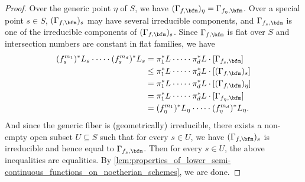 \begin{proof}
    Over the generic point $\eta$ of $S$, we have $(\Gamma_{f,\bfm})_\eta = \Gamma_{f_\eta,\bfm}$.
    Over a special point $s \in S$, $(\Gamma_{f,\bfm})_s$ may have several irreducible components, and $\Gamma_{f_s,\bfm}$ is one of the irreducible components of $(\Gamma_{f,\bfm})_s$.
    Since $\Gamma_{f,\bfm}$ is flat over $S$ and intersection numbers are constant in flat families, we have
    \begin{align*}
      (f_s^{m_1})^*L_s \cdot \cdots \cdot (f_s^{m_d})^*L_s & = \pi_1^*L \cdot \cdots \cdot \pi_d^*L \cdot [\Gamma_{f_s,\bfm}] \\
      & \leq \pi_1^*L \cdot \cdots \cdot \pi_d^*L \cdot [(\Gamma_{f,\bfm})_s] \\
      & = \pi_1^*L \cdot \cdots \cdot \pi_d^*L \cdot [(\Gamma_{f,\bfm})_\eta] \\
      & = \pi_1^*L \cdot \cdots \cdot \pi_d^*L \cdot [\Gamma_{f_\eta,\bfm}] \\
      & = (f_\eta^{m_1})^*L_\eta \cdot \cdots \cdot (f_\eta^{m_d})^*L_\eta.
    \end{align*}
    And since the generic fiber is (geometrically) irreducible, there exists a non-empty open subset $U \subseteq S$ such that for every $s \in U$, we have $(\Gamma_{f,\bfm})_s$ is irreducible and hence equal to $\Gamma_{f_s,\bfm}$.
    Then for every $s \in U$, the above inequalities are equalities.
    By \cref{lem:properties_of_lower_semi-continuous_functions_on_noetherian_schemes}, we are done.
  \end{proof}

